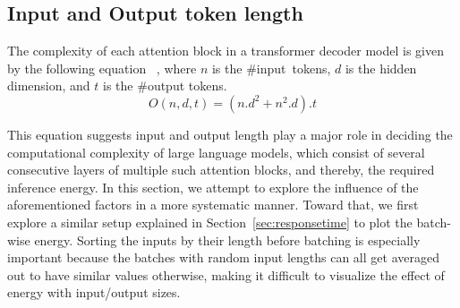 





\subsection{Input and Output token length}
\label{sec:input-output}

The complexity of each attention block in a transformer decoder model is given by the following equation ~\cite{vaswani2017attention}, where $n$ is the \#input~tokens, $d$ is the hidden dimension, and $t$ is the \#output tokens.
%
\begin{equation}
\label{eq:llm-complexity}
O(n,d,t) = (n.d^2+n^2.d).t
\end{equation}


This equation suggests input and output length play a major role in deciding the computational complexity of large language models, which consist of several consecutive layers of multiple such attention blocks, and thereby, the required inference energy. 
In this section, we attempt to explore the influence of the aforementioned factors in a more systematic manner. 
%
Toward that, 
we first explore a similar setup explained in Section~\ref{sec:responsetime} to plot the batch-wise energy. Sorting the inputs by their length before batching is especially important because the batches with random input lengths can all get averaged out to have similar values otherwise, making it difficult to visualize the effect of energy with input/output sizes.
%



